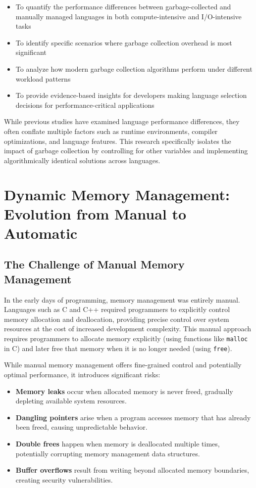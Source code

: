 \documentclass{article}
\begin{document}
\begin{itemize}
    \item To quantify the performance differences between garbage-collected and manually managed languages in both compute-intensive and I/O-intensive tasks 
    \item To identify specific scenarios where garbage collection overhead is most significant 
    \item To analyze how modern garbage collection algorithms perform under different workload patterns 
    \item To provide evidence-based insights for developers making language selection decisions for performance-critical applications 
\end{itemize}

While previous studies have examined language performance differences, they often conflate multiple factors such as runtime environments, compiler optimizations, and language features. This research specifically isolates the impact of garbage collection by controlling for other variables and implementing algorithmically identical solutions across languages.


\section{Dynamic Memory Management: Evolution from Manual to Automatic}

\subsection{The Challenge of Manual Memory Management}

In the early days of programming, memory management was entirely manual. Languages such as C and C++ required programmers to explicitly control memory allocation and deallocation, providing precise control over system resources at the cost of increased development complexity. This manual approach requires programmers to allocate memory explicitly (using functions like \texttt{malloc} in C) and later free that memory when it is no longer needed (using \texttt{free}).

While manual memory management offers fine-grained control and potentially optimal performance, it introduces significant risks:

\begin{itemize}
    \item \textbf{Memory leaks} occur when allocated memory is never freed, gradually depleting available system resources.
    \item \textbf{Dangling pointers} arise when a program accesses memory that has already been freed, causing unpredictable behavior.
    \item \textbf{Double frees} happen when memory is deallocated multiple times, potentially corrupting memory management data structures.
    \item \textbf{Buffer overflows} result from writing beyond allocated memory boundaries, creating security vulnerabilities.
\end{itemize}
\end{document}
